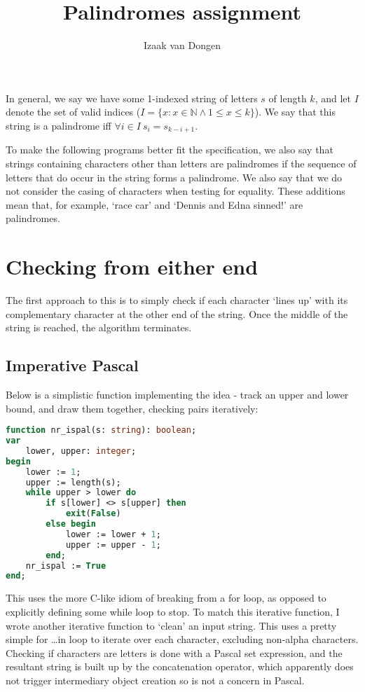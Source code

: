 \documentclass{article}
\title{Palindromes assignment}
\author{Izaak van Dongen}
\begin{document}
    \maketitle
    \tableofcontents
    \lstlistoflistings

    In general, we say we have some 1-indexed string of letters $s$ of length
    $k$, and let $I$ denote the set of valid indices
    ($I = \{x: x \in \mathbb{N} \land 1 \leq x \leq k\}$).
    We say that this string is a palindrome iff
    $ \forall i \in I\ s_i = s_{k - i + 1} $.

    To make the following programs better fit the specification, we also say
    that strings containing characters other than letters are palindromes if
    the sequence of letters that do occur in the string forms a palindrome. We
    also say that we do not consider the casing of characters when testing for
    equality. These additions mean that, for example, `race car' and `Dennis
    and Edna sinned!' are palindromes.

    \section{Checking from either end}
    The first approach to this is to simply check if each character `lines up'
    with its complementary character at the other end of the string. Once the
    middle of the string is reached, the algorithm terminates.

    \subsection{Imperative Pascal}

    Below is a simplistic function implementing the idea - track an upper and
    lower bound, and draw them together, checking pairs iteratively:

\begin{lstlisting}[language=Pascal, caption=Nonrecursive palindrome function in Pascal]
function nr_ispal(s: string): boolean;
var
    lower, upper: integer;
begin
    lower := 1;
    upper := length(s);
    while upper > lower do
        if s[lower] <> s[upper] then
            exit(False)
        else begin
            lower := lower + 1;
            upper := upper - 1;
        end;
    nr_ispal := True
end;
\end{lstlisting}

    This uses the more C-like idiom of breaking from a for loop, as opposed to
    explicitly defining some while loop to stop. To match this iterative
    function, I wrote another iterative function to `clean' an input string.
    This uses a pretty simple for \ldots in loop to iterate over each
    character, excluding non-alpha characters. Checking if characters are
    letters is done with a Pascal set expression, and the resultant string is
    built up by the concatenation operator, which apparently does not trigger
    intermediary object creation so is not a concern in Pascal.
\end{document}
